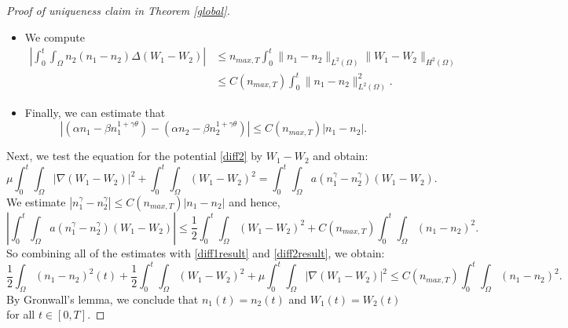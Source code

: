 \documentclass[12pt]{article}
\theoremstyle{plain}
\begin{document}
\begin{proof}[Proof of uniqueness claim in Theorem \ref{global}]
\begin{itemize}
by Calder\'{o}n-Zygmund estimates applied to \eqref{diff2}. Therefore, since $\|\nabla n_{2}\|_{L^{3}(\Omega)} \le C$ by assumption, we estimate:
\begin{equation*}
\left|\int_{0}^{t} \int_{\Omega} (n_{1} - n_{2}) \nabla n_{2} \cdot \nabla (W_{1} - W_{2})\right| \le C(n_{max, T})\int_{0}^{t} \|n_{1} - n_{2}\|^{2}_{L^{2}(\Omega)}.
\end{equation*}
\item We compute
\begin{align*}
\left|\int_{0}^{t} \int_{\Omega} n_{2}(n_{1} - n_{2}) \Delta(W_{1} - W_{2})\right| &\le n_{max, T} \int_{0}^{t} \|n_{1} - n_{2}\|_{L^{2}(\Omega)} \|W_{1} - W_{2}\|_{H^{2}(\Omega)} \\
&\le C(n_{max, T}) \int_{0}^{t} \|n_{1} - n_{2}\|^{2}_{L^{2}(\Omega)}.
\end{align*}
\item Finally, we can estimate that
\begin{equation*}
|(\alpha n_{1} - \beta n_{1}^{1 + \gamma \theta}) - (\alpha n_{2} - \beta n_{2}^{1 + \gamma \theta})| \le C(n_{max, T}) |n_{1} - n_{2}|.
\end{equation*}
\end{itemize}
Next, we test the equation for the potential \eqref{diff2} by $W_{1} - W_{2}$ and obtain:
\begin{equation}\label{diff2result}
\mu \int_{0}^{t} \int_{\Omega} |\nabla (W_{1} - W_{2})|^{2} + \int_{0}^{t} \int_{\Omega} (W_{1} - W_{2})^{2} = \int_{0}^{t} \int_{\Omega} a(n_{1}^{\gamma} - n_{2}^{\gamma})(W_{1} - W_{2}).
\end{equation}
We estimate $|n_{1}^{\gamma} - n_{2}^{\gamma}| \le C(n_{max, T}) |n_{1} - n_{2}|$ and hence,
\begin{equation*}
\left|\int_{0}^{t} \int_{\Omega} a(n_{1}^{\gamma} - n_{2}^{\gamma}) (W_{1} - W_{2})\right| \le \frac{1}{2} \int_{0}^{t} \int_{\Omega} (W_{1} - W_{2})^{2} + C(n_{max, T}) \int_{0}^{t} \int_{\Omega} (n_{1} - n_{2})^{2}.
\end{equation*}
So combining all of the estimates with \eqref{diff1result} and \eqref{diff2result}, we obtain:
\begin{equation*}
\frac{1}{2} \int_{\Omega} (n_{1} - n_{2})^{2}(t) + \frac{1}{2} \int_{0}^{t} \int_{\Omega} (W_{1} - W_{2})^{2} + \mu \int_{0}^{t} \int_{\Omega} |\nabla(W_{1} - W_{2})|^{2} \le C(n_{max, T}) \int_{0}^{t} \int_{\Omega} (n_{1} - n_{2})^{2}.
\end{equation*}
By Gronwall's lemma, we conclude that $n_{1}(t) = n_{2}(t)$ and $W_{1}(t) = W_{2}(t)$ for all $t \in [0, T]$. 
\end{proof}
\end{document}

